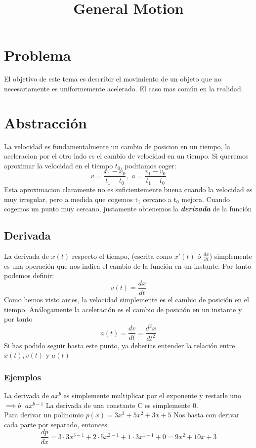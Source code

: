 \documentclass[11pt]{article}
\title{General Motion}
\begin{document}

\section{Problema}
\label{sec:orga79bcb1}
El objetivo de este tema es describir el movimiento de un objeto que no necesariamente es uniformemente acelerado. El caso mas común en la realidad.
\section{Abstracci\'on}
\label{sec:org946cc3e}
La velocidad es fundamentalmente un cambio de posicion en un tiempo, la aceleracion por el otro lado es el cambio de velocidad en un tiempo. Si queremos aproximar la velocidad en el tiempo \(t_{0}\), podriamos coger: \\
\[
v = \frac{x_{1} - x_{0}}{t_{1} - t_{0}}, \hspace{4pt}
a = \frac{v_{1} - v_{0}}{t_{1} - t_{0}}
\]
Esta aproximacion claramente no es suficientemente buena cuando la velocidad es muy irregular, pero a medida que cogemos t\(_{\text{1}}\) cercano a t\(_{\text{0}}\) mejora. Cuando cogemos un punto muy cercano, justamente obtenemos la \textbf{\textbf{\emph{derivada}}} de la función

\subsection{Derivada}
\label{sec:org14ed4d4}
La derivada de \(x(t)\) respecto el tiempo, (escrita como \(x'(t)\) ó \(\frac{dx}{dt}\)) simplemente es una operación que nos indica el cambio de la función en un instante. Por tanto podemos definir:
\[
v(t) =  \frac{dx}{dt}
\]
Como hemos visto antes, la velocidad simplemente es el cambio de posición en el tiempo.
Análogamente la aceleración es el cambio de posición en un instante y por tanto
\[
a(t) = \frac{dv}{dt} = \frac{d^{2}x}{dt^{2}}
\]
Si has podido seguir hasta este punto, ya deberías entender la relación entre \(x(t), v(t)\) y \(a(t)\)

\subsubsection{Ejemplos}
\label{sec:org76faad0}

   La derivada de \(ax^{b}\) es simplemente multiplicar por el exponente y restarle uno \(\implies b \cdot ax^{b-1}\)
   La derivada de una constante C es simplemente 0. \\
   Para derivar un polinomio \(p(x) = 3x^{3} + 5x^{2} + 3x + 5\) Nos basta con derivar cada parte por separado, entonces
   \[
   \frac{dp}{dx} = 3 \cdot3x^{3-1} + 2 \cdot 5x^{2-1} + 1 \cdot 3x^{1-1} + 0 = 9x^{2} + 10x + 3
   \]
\end{document}
